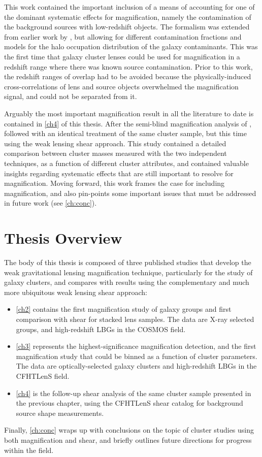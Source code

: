 This work contained the important inclusion of a means of accounting for one of the dominant systematic effects for magnification, namely the contamination of the background sources with low-redshift objects. The formalism was extended from earlier work by \citet{Hildebrandt13}, but allowing for different contamination fractions and models for the halo occupation distribution of the galaxy contaminants. This was the first time that galaxy cluster lenses could be used for magnification in a redshift range where there was known source contamination. Prior to this work, the redshift ranges of overlap had to be avoided because the physically-induced cross-correlations of lens and source objects overwhelmed the magnification signal, and could not be separated from it.

Arguably the most important magnification result in all the literature to date is contained in \autoref{ch4} of this thesis. After the semi-blind magnification analysis of \citet{Ford14}, \citet{Ford15} followed with an identical treatment of the same cluster sample, but this time using the weak lensing shear approach. This study contained a detailed comparison between cluster masses measured with the two independent techniques, as a function of different cluster attributes, and contained valuable insights regarding systematic effects that are still important to resolve for magnification. Moving forward, this work frames the case for including magnification, and also pin-points some important issues that must be addressed in future work (see \autoref{ch:conc}).

\section{Thesis Overview}
\label{sec:Overview}

The body of this thesis is composed of three published studies that develop the weak gravitational lensing magnification technique, particularly for the study of galaxy clusters, and compares with results using the complementary and much more ubiquitous weak lensing shear approach:
\begin{itemize}
\item \autoref{ch2} contains the first magnification study of galaxy groups and first comparison with shear for stacked lens samples. The data are X-ray selected groups, and high-redshift \ac{LBG}s in the \ac{COSMOS} field.
\item \autoref{ch3} represents the highest-significance magnification detection, and the first magnification study that could be binned as a function of cluster parameters. The data are optically-selected galaxy clusters and high-redshift \ac{LBG}s in the \ac{CFHTLenS} field.
\item \autoref{ch4} is the follow-up shear analysis of the same cluster sample presented in the previous chapter, using the \ac{CFHTLenS} shear catalog for background source shape measurements.
\end{itemize}
Finally, \autoref{ch:conc} wraps up with conclusions on the topic of cluster studies using both magnification and shear, and briefly outlines future directions for progress within the field.

\endinput
Any text after an \endinput is ignored.
You could put scraps here or things in progress.
